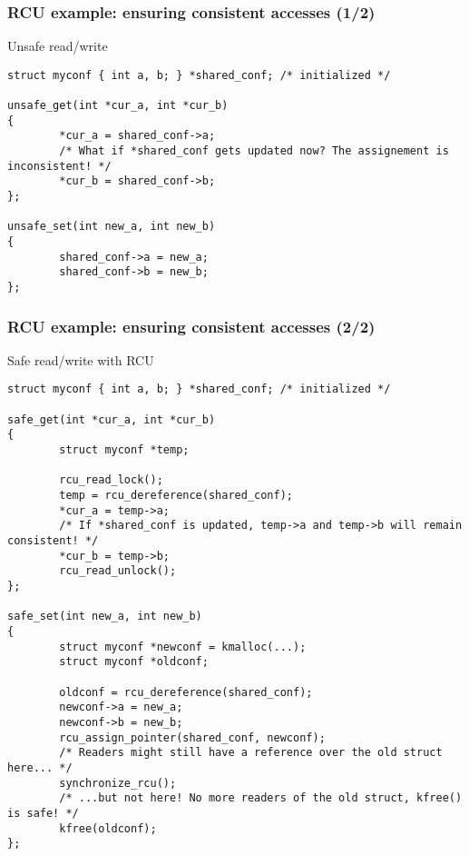 \begin{frame}[fragile]
  \frametitle{RCU example: ensuring consistent accesses (1/2)}
    \begin{block}{Unsafe read/write}
      \begin{verbatim}
struct myconf { int a, b; } *shared_conf; /* initialized */

unsafe_get(int *cur_a, int *cur_b)
{
        *cur_a = shared_conf->a;
        /* What if *shared_conf gets updated now? The assignement is inconsistent! */
        *cur_b = shared_conf->b;
};

unsafe_set(int new_a, int new_b)
{
        shared_conf->a = new_a;
        shared_conf->b = new_b;
};
    \end{verbatim}
  \end{block}
\end{frame}

\begin{frame}[fragile]
  \frametitle{RCU example: ensuring consistent accesses (2/2)}
  \begin{block}{Safe read/write with RCU}
    \begin{verbatim}
struct myconf { int a, b; } *shared_conf; /* initialized */

safe_get(int *cur_a, int *cur_b)
{
        struct myconf *temp;

        rcu_read_lock();
        temp = rcu_dereference(shared_conf);
        *cur_a = temp->a;
        /* If *shared_conf is updated, temp->a and temp->b will remain consistent! */
        *cur_b = temp->b;
        rcu_read_unlock();
};

safe_set(int new_a, int new_b)
{
        struct myconf *newconf = kmalloc(...);
        struct myconf *oldconf;

        oldconf = rcu_dereference(shared_conf);
        newconf->a = new_a;
        newconf->b = new_b;
        rcu_assign_pointer(shared_conf, newconf);
        /* Readers might still have a reference over the old struct here... */
        synchronize_rcu();
        /* ...but not here! No more readers of the old struct, kfree() is safe! */
        kfree(oldconf);
};
    \end{verbatim}
  \end{block}
\end{frame}

